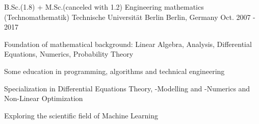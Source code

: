 


\begin{cventries}


\cventry
{B.Sc.(1.8) + M.Sc.(canceled with 1.2) Engineering mathematics (Technomathematik)} %
{Technische Universität Berlin} %
{Berlin, Germany} %
{Oct. 2007 - 2017} %
{ %
\begin{cvitems}
\item {Foundation of mathematical background: Linear Algebra, Analysis, Differential Equations, Numerics, Probability Theory}
\item {Some education in programming, algorithms and technical engineering}
\item {Specialization in Differential Equations Theory, -Modelling and -Numerics and Non-Linear Optimization}
\item{Exploring the scientific field of Machine Learning}
\end{cvitems}
}


\end{cventries}